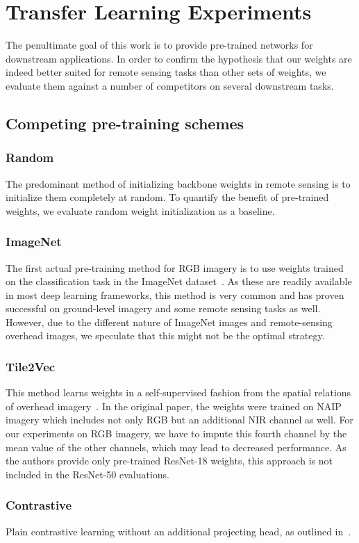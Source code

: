 \documentclass[journal]{IEEEtran}
\begin{document}
\section{Transfer Learning Experiments}\label{sect:experiments}
The penultimate goal of this work is to provide pre-trained networks for downstream applications.
In order to confirm the hypothesis that our weights are indeed better suited for remote sensing
tasks than other sets of weights, we evaluate them against a number of competitors on
several downstream tasks.

\subsection{Competing pre-training schemes}
\subsubsection{Random}
The predominant method of initializing backbone weights in remote sensing
is to initialize them completely at random.
To quantify the benefit of pre-trained weights,
we evaluate random weight initialization as a baseline.
\subsubsection{ImageNet}
The first actual pre-training method for RGB imagery is to use weights
trained on the classification task in the ImageNet dataset~\cite{imagenet}.
As these are readily available in most deep learning frameworks,
this method is very common and has proven successful on ground-level imagery and some remote sensing
tasks as well.
However, due to the different nature of ImageNet images and remote-sensing overhead images,
we speculate that this might not be the optimal strategy.
\subsubsection{Tile2Vec}
This method learns weights in a self-supervised fashion from the spatial relations
of overhead imagery~\cite{tile2vec}.
In the original paper,
the weights were trained on NAIP imagery which includes not only RGB but an additional NIR channel
as well.
For our experiments on RGB imagery,
we have to impute this fourth channel by the mean value of the other channels,
which may lead to decreased performance.
As the authors provide only pre-trained ResNet-18 weights,
this approach is not included in the ResNet-50 evaluations.
\subsubsection{Contrastive}
Plain contrastive learning without an additional projecting head,
as outlined in~\cite{simclr}.
\end{document}
